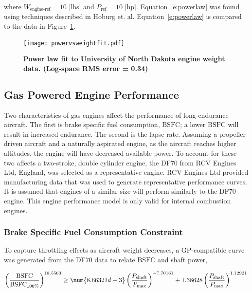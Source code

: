 where $W_{\text{engine-ref}} = 10$ [lbs] and $P_{\text{ref}} = 10$ [hp].  Equation~\eqref{e:powerlaw} was found using techniques described in Hoburg et. al\cite{fitting}. Equation~\eqref{e:powerlaw} is compared to the data in Figure~\ref{f:powervsweightfit}.

\begin{figure}[H]
	\begin{center}
	\texttt{[image: powervsweightfit.pdf]}
    \caption{\textbf{Power law fit to University of North Dakota engine weight data\cite{gasengine}. (Log-space RMS error = 0.34)}}
	\label{f:powervsweightfit}
	\end{center}
\end{figure}

\subsection{Gas Powered Engine Performance}

Two characteristics of gas engines affect the performance of long-endurance aircraft.  
The first is brake specific fuel consumption, $\text{BSFC}$; a lower $\text{BSFC}$ will result in increased endurance.  
The second is the lapse rate.  
Assuming a propeller driven aircraft and a naturally aspirated engine, as the aircraft reaches higher altitudes, the engine will have decreased available power. 
To account for these two affects a two-stroke, double cylinder engine, the DF70 from RCV Engines Ltd, England, was selected as a representative engine.  
RCV Engines Ltd provided manufacturing data that was used to generate representative performance curves.\cite{rcvengines}
It is assumed that engines of a similar size will perform similarly to the DF70 engine.  
This engine performance model is only valid for internal combustion engines.

\subsubsection{Brake Specific Fuel Consumption Constraint}

To capture throttling effects as aircraft weight decreases, a GP-compatible curve was generated from the DF70 data to relate $\text{BSFC}$ and shaft power, 

\begin{equation}
    \label{e:rpmtobsfc}
    \left( \frac{\text{BSFC}}{\text{BSFC}_{100\%}} \right)^{18.5563} \geq \num{8.66321d-3}\left( \frac{P_{\text{shaft}}}{P_{\text{max}}}\right)^{-7.70161} + 1.38628\left( \frac{P_{\text{shaft}}}{P_{\text{max}}} \right)^{1.12921} \\
\end{equation}


